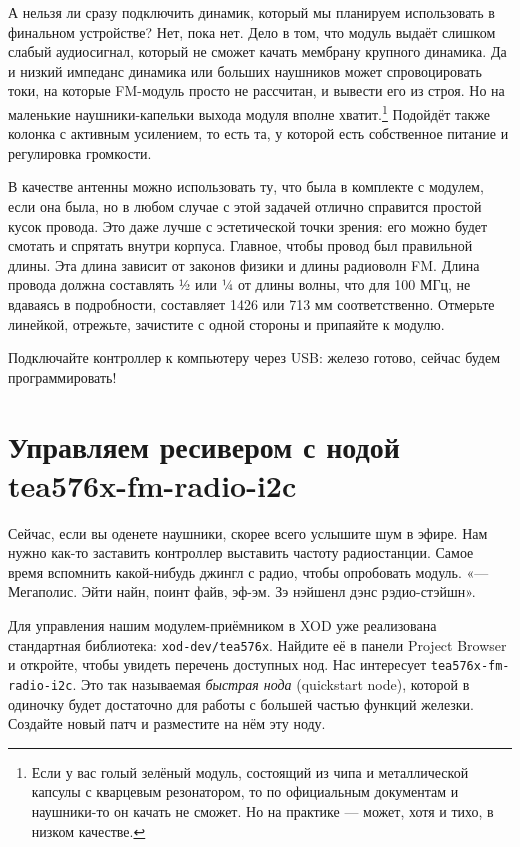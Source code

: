 А нельзя ли сразу подключить динамик, который мы планируем использовать в финальном устройстве? Нет, пока нет. Дело в том, что модуль выдаёт слишком слабый аудиосигнал, который не сможет качать мембрану крупного динамика. Да и низкий импеданс динамика или больших наушников может спровоцировать токи, на которые FM-модуль просто не рассчитан, и вывести его из строя. Но на маленькие наушники-капельки выхода модуля вполне хватит.\footnote{Если у вас голый зелёный модуль, состоящий из чипа и металлической капсулы с кварцевым резонатором, то по официальным документам и наушники-то он качать не сможет. Но на практике — может, хотя и тихо, в низком качестве.} Подойдёт также колонка с активным усилением, то есть та, у которой есть собственное питание и регулировка громкости.

В качестве антенны можно использовать ту, что была в комплекте с модулем, если она была, но в любом случае с этой задачей отлично справится простой кусок провода. Это даже лучше с эстетической точки зрения: его можно будет смотать и спрятать внутри корпуса. Главное, чтобы провод был правильной длины. Эта длина зависит от законов физики и длины радиоволн FM. Длина провода должна составлять ½ или ¼ от длины волны, что для 100 МГц, не вдаваясь в подробности, составляет 1426 или 713 мм соответственно. Отмерьте линейкой, отрежьте, зачистите с одной стороны и припаяйте к модулю.

Подключайте контроллер к компьютеру через USB: железо готово, сейчас будем программировать!

\section{Управляем ресивером с нодой tea576x-fm-radio-i2c}


Сейчас, если вы оденете наушники, скорее всего услышите шум в эфире. Нам нужно как-то заставить контроллер выставить частоту радиостанции. Самое время вспомнить какой-нибудь джингл с радио, чтобы опробовать модуль.  «— Мегаполис. Эйти найн, поинт файв, эф-эм. Зэ нэйшенл дэнс рэдио-стэйшн».

Для управления нашим модулем-приёмником в XOD уже реализована стандартная библиотека: \texttt{xod-dev/tea576x}. Найдите её в панели Project Browser и откройте, чтобы увидеть перечень доступных нод. Нас интересует \texttt{tea576x-fm-radio-i2c}. Это так называемая \emph{быстрая нода} (quickstart node), которой в одиночку будет достаточно для работы с большей частью функций железки. Создайте новый патч и разместите на нём эту ноду.

